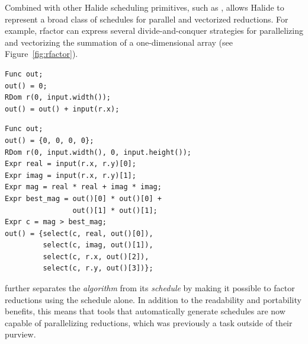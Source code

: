 Combined with other Halide scheduling primitives, such as ,  allows Halide to represent a broad class of schedules for parallel and vectorized reductions. For example, rfactor can express several divide-and-conquer strategies for parallelizing and vectorizing the summation of a one-dimensional array (see Figure~\ref{fig:rfactor}).

\begin{lstlisting}[float,
caption = {Halide sum reduction over a one-dimensional vector.}, label={lst:sum}]
Func out;
out() = 0;
RDom r(0, input.width());
out() = out() + input(r.x);
\end{lstlisting}
\begin{lstlisting}[float,
caption = {Halide reduction which finds the complex number with the greatest magnitude and its location in a two-dimensional array.}, label={lst:complex_magnitude}]
Func out;
out() = {0, 0, 0, 0};
RDom r(0, input.width(), 0, input.height());
Expr real = input(r.x, r.y)[0];
Expr imag = input(r.x, r.y)[1];
Expr mag = real * real + imag * imag;
Expr best_mag = out()[0] * out()[0] +
                out()[1] * out()[1];
Expr c = mag > best_mag;
out() = {select(c, real, out()[0]),
         select(c, imag, out()[1]),
         select(c, r.x, out()[2]),
         select(c, r.y, out()[3])};
\end{lstlisting}

 further separates the \emph{algorithm} from its \emph{schedule} by making it possible to factor reductions using the schedule alone. In addition to the readability and portability benefits, this means that tools that automatically generate schedules \cite{Mullapudi:2016:ASH:2897824.2925952, Ragan-Kelley:2013:HLC:2491956.2462176} are now capable of parallelizing reductions, which was previously a task outside of their purview.

